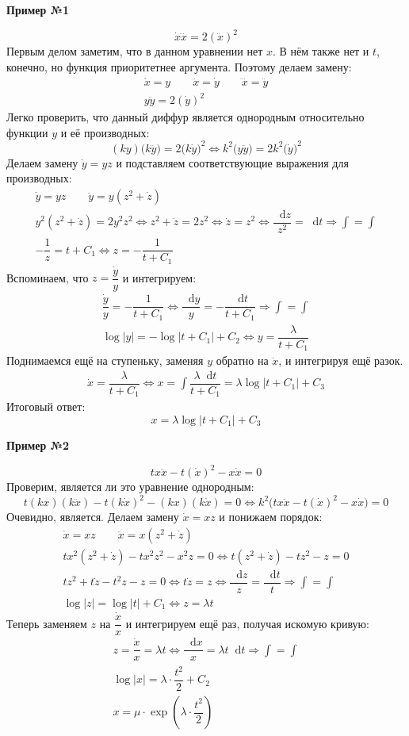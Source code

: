 \documentclass[a4paper,12pt]{article}
\renewcommand*\d{\mathop{}\!\mathrm{d}}
\newcommand{\dy}{\dot{y}}
\newcommand{\ddy}{\ddot{y}}
\newcommand{\dx}{\dot{x}}
\newcommand{\ddx}{\ddot{x}}
\newcommand{\dddx}{\dddot{x}}
\newcommand{\dz}{\dot{z}}
\newcommand{\bto}{\Longrightarrow}
\newcommand{\ds}{\displaystyle}
\begin{document}
\textbf{Пример №1}

\[\dx\dddx = 2(\ddx)^2\]
Первым делом заметим, что в данном уравнении нет $x$. В нём также нет и $t$, конечно, но функция приоритетнее аргумента. Поэтому делаем замену:
\begin{gather*}
	\dx = y \qquad \ddx = \dy \qquad \dddx = \ddy\\
	y\ddy = 2(\dy)^2
\end{gather*}
Легко проверить, что данный диффур является однородным относительно функции $y$ и её производных:
\[(ky)\big(k\ddy\big) = 2\big(k\dy\big)^2 \iff k^2\big(y\ddy\big) = 2k^2\big(\dy\big)^2\]
Делаем замену $\dy = yz$ и подставляем соответствующие выражения для производных:
\begin{gather*}
	\dy = yz \qquad \ddy = y\left(z^2 + \dz\right)\\
	y^2\left(z^2 + \dz\right) = 2y^2z^2 \iff z^2 + \dz = 2z^2 \iff \dz = z^2 \iff \dfrac{\d z}{z^2} = \d t \bto \ds\int = \int\\
	-\dfrac{1}{z} = t + C_1 \iff z = -\dfrac{1}{t + C_1}
\end{gather*}
Вспоминаем, что $z = \dfrac{\dy}{y}$ и интегрируем:
\begin{gather*}
	\dfrac{\dy}{y} = -\dfrac{1}{t + C_1} \iff \dfrac{\d y}{y} = -\dfrac{\d t}{t + C_1 }\bto \ds\int = \int\\
	\log|y| = -\log|t + C_1| + C_2 \iff y = \dfrac{\lambda}{t + C_1}
\end{gather*}
Поднимаемся ещё на ступеньку, заменяя $y$ обратно на $\dx$, и интегрируя ещё разок.
\begin{gather*}
	\dx = \dfrac{\lambda}{t + C_1} \iff x = \ds\int \dfrac{\lambda\d t}{t + C_1} = \lambda\log|t + C_1| + C_3
\end{gather*}
Итоговый ответ:
\[x = \lambda\log|t + C_1| + C_3\]

\textbf{Пример №2}

\[tx\ddx - t(\dx)^2 - x\dx = 0\]
Проверим, является ли это уравнение однородным:
\[t(kx)(k\ddx) - t(k\dx)^2 - (kx)(k\dx) = 0 \iff k^2\big(tx\ddx - t(\dx)^2 - x\dx\big) = 0\]
Очевидно, является. Делаем замену $\dx = xz$ и понижаем порядок:
\begin{gather*}
	\dx = xz \qquad \ddx = 	x\left(z^2 + \dz\right)\\
	tx^2\left(z^2 + \dz\right) - tx^2z^2 - x^2z = 0 \iff t\left(z^2 + \dz\right) - tz^2 - z = 0\\
	tz^2 + t\dz - t^2z - z = 0 \iff t\dz = z \iff \dfrac{\d z}{z} = \dfrac{\d t}{t} \bto \ds\int = \int\\
	\log|z| = \log|t| + C_1 \iff z = \lambda t
\end{gather*}
Теперь заменяем $z$ на $\dfrac{\dx}{x}$ и интегрируем ещё раз, получая искомую кривую:
\begin{gather*}
	z = \dfrac{\dx}{x} = \lambda t \iff \dfrac{\d x}{x} = \lambda t \d t \bto \ds\int = \int\\
	\log|x| = \lambda \cdot \dfrac{t^2}{2} + C_2 \\
	x = \mu \cdot \exp(\lambda \cdot \dfrac{t^2}{2})
\end{gather*}
\end{document}
